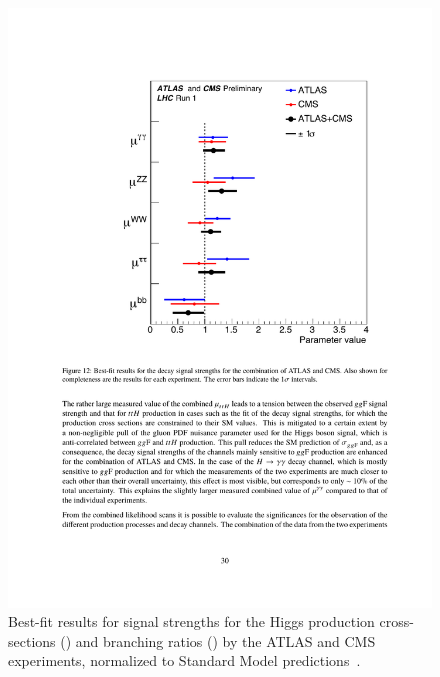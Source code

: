 \begin{figure}[hbtp]
\begin{center}
    \includegraphics[width=\cmsFigWidth]{figures/Higgsproperties-br}
    \caption{Best-fit results for signal strengths for the Higgs production cross-sections (\cmsLeft) and branching ratios (\cmsRight) by the ATLAS and CMS experiments, normalized to Standard Model predictions~\cite{ATLAS-CONF-2015-044}.}
    \label{fig:Higgsproperties}
  \end{center}
\end{figure}

